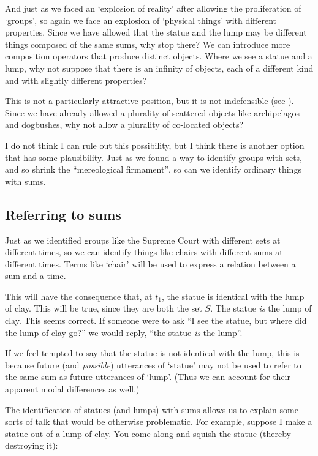 \documentclass[11pt]{article}
\begin{document}
\begin{spacing}{1.5}
And just as we faced an `explosion of reality' after allowing the
proliferation of `groups', so again we face an explosion of `physical
things' with different properties.  Since we have allowed that the
statue and the lump may be different things composed of the same sums,
why stop there?  We can introduce more composition operators that
produce distinct objects.  Where we see a statue and a lump, why not
suppose that there is an infinity of objects, each of a different kind
and with slightly different properties?

This is not a particularly attractive position, but it is not
indefensible (see \citet[section 4]{bennett2004}).  Since we have
already allowed a plurality of scattered objects like archipelagos and
dogbushes, why not allow a plurality of co-located objects?

I do not think I can rule out this possibility, but I think there is
another option that has some plausibility.  Just as we found a way to
identify groups with sets, and so shrink the ``mereological
firmament'', so can we identify ordinary things with sums.

\subsection{Referring to sums}
\label{chair-ref}
Just as we identified groups like the Supreme Court with different
sets at different times, so we can identify things like chairs with
different sums at different times.  Terms like `chair' will be used to
express a relation between a sum and a time.

This will have the consequence that, at $t_1$, the statue is identical
with the lump of clay.  This will be true, since they are both the set
$S$.  The statue {\em is} the lump of clay.  This seems correct.  If
someone were to ask ``I see the statue, but where did the lump of clay
go?'' we would reply, ``the statue {\em is} the lump''.

If we feel tempted to say that the statue is not identical with the
lump, this is because future (and {\em possible}) utterances of
`statue' may not be used to refer to the same sum as future utterances
of `lump'.  (Thus we can account for their apparent modal differences
as well.)

The identification of statues (and lumps) with sums allows us to
explain some sorts of talk that would be otherwise problematic.  For
example, suppose I make a statue out of a lump of clay.  You come
along and squish the statue (thereby destroying it):


\end{spacing}
\end{document}
